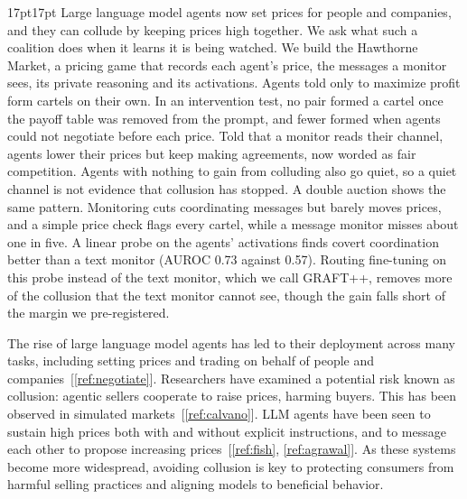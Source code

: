 \documentclass[11pt,letterpaper]{article}
\newcommand{\head}[1]{\par\vspace{26pt}{\noindent\fontsize{14}{17}\selectfont\bfseries\color[HTML]{434343}#1\par}\nopagebreak\vspace{6pt}\nopagebreak}
\begin{document}
\vspace{6pt}
\begin{adjustwidth}{17pt}{17pt}\singlespacing\noindent
Large language model agents now set prices for people and companies, and they can collude by keeping prices high together. We ask what such a coalition does when it learns it is being watched. We build the Hawthorne Market, a pricing game that records each agent's price, the messages a monitor sees, its private reasoning and its activations. Agents told only to maximize profit form cartels on their own. In an intervention test, no pair formed a cartel once the payoff table was removed from the prompt, and fewer formed when agents could not negotiate before each price. Told that a monitor reads their channel, agents lower their prices but keep making agreements, now worded as fair competition. Agents with nothing to gain from colluding also go quiet, so a quiet channel is not evidence that collusion has stopped. A double auction shows the same pattern. Monitoring cuts coordinating messages but barely moves prices, and a simple price check flags every cartel, while a message monitor misses about one in five. A linear probe on the agents' activations finds covert coordination better than a text monitor (AUROC 0.73 against 0.57). Routing fine-tuning on this probe instead of the text monitor, which we call GRAFT++, removes more of the collusion that the text monitor cannot see, though the gain falls short of the margin we pre-registered. 
\end{adjustwidth}
\enlargethispage{42pt}
\newpage


\head{1. Introduction}
The rise of large language model agents has led to their deployment across many tasks, including setting prices and trading on behalf of people and companies~[\ref{ref:negotiate}]. Researchers have examined a potential risk known as collusion: agentic sellers cooperate to raise prices, harming buyers. This has been observed in simulated markets~[\ref{ref:calvano}]. LLM agents have been seen to sustain high prices both with and without explicit instructions, and to message each other to propose increasing prices~[\ref{ref:fish}, \ref{ref:agrawal}]. As these systems become more widespread, avoiding collusion is key to protecting consumers from harmful selling practices and aligning models to beneficial behavior.
\end{document}
